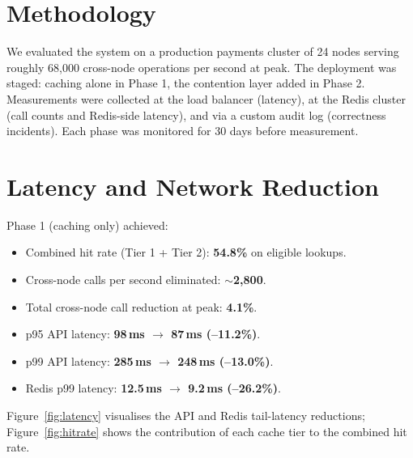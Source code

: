 \section{Methodology}
We evaluated the system on a production payments cluster of 24 nodes serving roughly 68{,}000 cross-node operations per second at peak. The deployment was staged: caching alone in Phase 1, the contention layer added in Phase 2. Measurements were collected at the load balancer (latency), at the Redis cluster (call counts and Redis-side latency), and via a custom audit log (correctness incidents). Each phase was monitored for 30 days before measurement.

\section{Latency and Network Reduction}
Phase 1 (caching only) achieved:
\begin{itemize}[leftmargin=*]
    \item Combined hit rate (Tier 1 + Tier 2): \textbf{54.8\%} on eligible lookups.
    \item Cross-node calls per second eliminated: \textbf{$\sim$2{,}800}.
    \item Total cross-node call reduction at peak: \textbf{4.1\%}.
    \item p95 API latency: \textbf{98\,ms $\rightarrow$ 87\,ms (--11.2\%)}.
    \item p99 API latency: \textbf{285\,ms $\rightarrow$ 248\,ms (--13.0\%)}.
    \item Redis p99 latency: \textbf{12.5\,ms $\rightarrow$ 9.2\,ms (--26.2\%)}.
\end{itemize}

Figure~\ref{fig:latency} visualises the API and Redis tail-latency reductions; Figure~\ref{fig:hitrate} shows the contribution of each cache tier to the combined hit rate.

